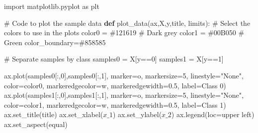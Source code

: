 \documentclass[
  letterpaper,
  DIV=11,
  numbers=noendperiod]{scrartcl}
\newenvironment{Shaded}{\begin{snugshade}}{\end{snugshade}}
\newcommand{\CommentTok}[1]{\textcolor[rgb]{0.37,0.37,0.37}{#1}}
\newcommand{\DecValTok}[1]{\textcolor[rgb]{0.68,0.00,0.00}{#1}}
\newcommand{\FloatTok}[1]{\textcolor[rgb]{0.68,0.00,0.00}{#1}}
\newcommand{\ImportTok}[1]{\textcolor[rgb]{0.00,0.46,0.62}{#1}}
\newcommand{\KeywordTok}[1]{\textcolor[rgb]{0.00,0.23,0.31}{\textbf{#1}}}
\newcommand{\NormalTok}[1]{\textcolor[rgb]{0.00,0.23,0.31}{#1}}
\newcommand{\OperatorTok}[1]{\textcolor[rgb]{0.37,0.37,0.37}{#1}}
\newcommand{\StringTok}[1]{\textcolor[rgb]{0.13,0.47,0.30}{#1}}
\begin{document}
\begin{Shaded}
\begin{Highlighting}[]
\ImportTok{import}\NormalTok{ matplotlib.pyplot }\ImportTok{as}\NormalTok{ plt}

\CommentTok{\# Code to plot the sample data}
\KeywordTok{def}\NormalTok{ plot\_data(ax,X,y,title, limits):}
    \CommentTok{\# Select the colors to use in the plots}
\NormalTok{    color0 }\OperatorTok{=} \StringTok{\textquotesingle{}\#121619\textquotesingle{}} \CommentTok{\# Dark grey}
\NormalTok{    color1 }\OperatorTok{=} \StringTok{\textquotesingle{}\#00B050\textquotesingle{}} \CommentTok{\# Green}
\NormalTok{    color\_boundary}\OperatorTok{=}\StringTok{\textquotesingle{}\#858585\textquotesingle{}}
    
    \CommentTok{\# Separate samples by class}
\NormalTok{    samples0 }\OperatorTok{=}\NormalTok{ X[y}\OperatorTok{==}\DecValTok{0}\NormalTok{]}
\NormalTok{    samples1 }\OperatorTok{=}\NormalTok{ X[y}\OperatorTok{==}\DecValTok{1}\NormalTok{]}

\NormalTok{    ax.plot(samples0[:,}\DecValTok{0}\NormalTok{],samples0[:,}\DecValTok{1}\NormalTok{],}
\NormalTok{        marker}\OperatorTok{=}\StringTok{\textquotesingle{}o\textquotesingle{}}\NormalTok{,}
\NormalTok{        markersize}\OperatorTok{=}\DecValTok{5}\NormalTok{,}
\NormalTok{        linestyle}\OperatorTok{=}\StringTok{"None"}\NormalTok{,}
\NormalTok{        color}\OperatorTok{=}\NormalTok{color0,}
\NormalTok{        markeredgecolor}\OperatorTok{=}\StringTok{\textquotesingle{}w\textquotesingle{}}\NormalTok{,}
\NormalTok{        markeredgewidth}\OperatorTok{=}\FloatTok{0.5}\NormalTok{,}
\NormalTok{        label}\OperatorTok{=}\StringTok{\textquotesingle{}Class 0\textquotesingle{}}\NormalTok{)}
\NormalTok{    ax.plot(samples1[:,}\DecValTok{0}\NormalTok{],samples1[:,}\DecValTok{1}\NormalTok{],}
\NormalTok{        marker}\OperatorTok{=}\StringTok{\textquotesingle{}o\textquotesingle{}}\NormalTok{,}
\NormalTok{        markersize}\OperatorTok{=}\DecValTok{5}\NormalTok{,}
\NormalTok{        linestyle}\OperatorTok{=}\StringTok{"None"}\NormalTok{,}
\NormalTok{        color}\OperatorTok{=}\NormalTok{color1,}
\NormalTok{        markeredgecolor}\OperatorTok{=}\StringTok{\textquotesingle{}w\textquotesingle{}}\NormalTok{,}
\NormalTok{        markeredgewidth}\OperatorTok{=}\FloatTok{0.5}\NormalTok{,}
\NormalTok{        label}\OperatorTok{=}\StringTok{\textquotesingle{}Class 1\textquotesingle{}}\NormalTok{)}
\NormalTok{    ax.set\_title(title)}
\NormalTok{    ax.set\_xlabel(}\StringTok{\textquotesingle{}$x\_1$\textquotesingle{}}\NormalTok{)}
\NormalTok{    ax.set\_ylabel(}\StringTok{\textquotesingle{}$x\_2$\textquotesingle{}}\NormalTok{)}
\NormalTok{    ax.legend(loc}\OperatorTok{=}\StringTok{\textquotesingle{}upper left\textquotesingle{}}\NormalTok{)}
\NormalTok{    ax.set\_aspect(}\StringTok{\textquotesingle{}equal\textquotesingle{}}\NormalTok{)}


\end{Highlighting}
\end{Shaded}
\end{document}
